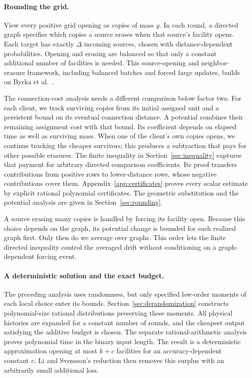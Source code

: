 \paragraph{Rounding the grid.}
View every positive grid opening as copies of mass \(g\). In each round,
a directed graph specifies which copies a source erases when that source's
facility opens. Each target has exactly \(\Delta\) incoming sources,
chosen with distance-dependent probabilities. Opening and erasing are
balanced so that only a constant additional number of facilities is
needed. This source-opening and neighbor-erasure framework, including
balanced batches and forced large updates, builds on Byrka et
al.~\cite[Sections~3--6]{ByrkaEtAl2026}.

The connection-cost analysis needs a different comparison below factor
two. For each client, we track surviving copies from its initial assigned
unit and a persistent bound on its eventual connection distance. A
potential combines their remaining assignment cost with that bound. Its
coefficient depends on elapsed time as well as surviving mass. When one
of the client's own copies opens, we continue tracking the cheaper
survivors; this produces a subtraction that pays for other possible
erasures. The finite inequality in Section~\ref{sec:inequality} captures
that payment for arbitrary directed comparison coefficients. Its proof
transfers contributions from positive rows to lower-distance rows, whose
negative contributions cover them. Appendix~\ref{app:certificates}
proves every scalar estimate by explicit rational polynomial certificates.
The geometric substitution and the potential analysis are given in
Section~\ref{sec:rounding}.

A source erasing many copies is handled by forcing its facility open.
Because this choice depends on the graph, its potential change is bounded
for each realized graph first. Only then do we average over graphs. This
order lets the finite directed inequality control the averaged drift
without conditioning on a graph-dependent forcing event.

\paragraph{A deterministic solution and the exact budget.}
The preceding analysis uses randomness, but only specified low-order
moments of each local choice enter its bounds. Section~\ref{sec:derandomization}
constructs polynomial-size rational distributions preserving these
moments. All physical histories are expanded for a constant number of
rounds, and the cheapest output satisfying the additive budget is chosen.
The separate rational-arithmetic analysis proves polynomial time in the
binary input length. The result is a deterministic approximation opening
at most \(k+c\) facilities for an accuracy-dependent constant \(c\).
Li and Svensson's reduction then removes this surplus with an arbitrarily
small additional loss.

